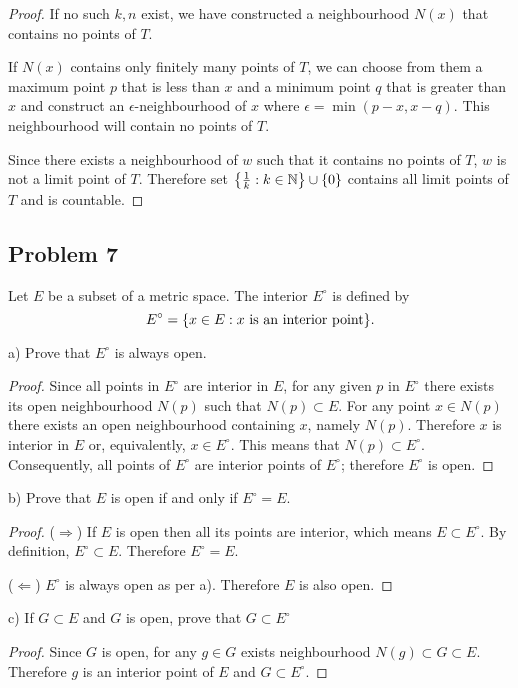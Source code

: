 \documentclass{article}
\newcommand{\N}{\mathbb{N}}
\DeclarePairedDelimiter{\set}{ \{ }{ \} }
\begin{document}
\begin{proof}
If no such $k, n$ exist, we have constructed a neighbourhood $N(x)$ that contains no points of $T$. 

If $N(x)$ contains only finitely many points of $T$, we can choose from them a maximum point $p$ that is less than $x$ and a minimum point $q$ that is greater than $x$ and construct an $\epsilon$-neighbourhood of $x$ where $\epsilon = \min(p-x, x-q)$.
This neighbourhood will contain no points of $T$.

Since there exists a neighbourhood of $w$ such that it contains no points of $T$, $w$ is not a limit point of $T$.
Therefore set $\set*{ \frac{1}{k} : k \in \N } \cup \set{0}$ contains all limit points of $T$ and is countable.

\end{proof}


\subsection*{Problem 7}

\begin{tcolorbox}
Let $E$ be a subset of a metric space.
The interior $E^\circ$ is defined by
\[ E^\circ = \set{x \in E : x \text{ is an interior point} }. \]

a) Prove that $E^\circ$ is always open.
\end{tcolorbox}

\begin{proof}

Since all points in $E^\circ$ are interior in $E$, for any given $p$ in $E^\circ$ there exists its open neighbourhood $N(p)$ such that $N(p) \subset E$.
For any point $x \in N(p)$ there exists an open neighbourhood containing $x$, namely $N(p)$.
Therefore $x$ is interior in $E$ or, equivalently, $x \in E^\circ$. This means that $N(p) \subset E^\circ$.
Consequently, all points of $E^\circ$ are interior points of $E^\circ$; therefore $E^\circ$ is open.

\end{proof}

\begin{tcolorbox}
b) Prove that $E$ is open if and only if $E^\circ = E$.
\end{tcolorbox}

\begin{proof}

($\Rightarrow$) If $E$ is open then all its points are interior, which means $E \subset E^\circ$.
By definition, $E^\circ \subset E$. Therefore $E^\circ = E$.

($\Leftarrow$) $E^\circ$ is always open as per a).
Therefore $E$ is also open.

\end{proof}

\begin{tcolorbox}
c) If $G \subset E$ and $G$ is open, prove that $G \subset E^\circ$
\end{tcolorbox}

\begin{proof}

Since $G$ is open, for any $g \in G$ exists neighbourhood $N(g) \subset G \subset E$.
Therefore $g$ is an interior point of $E$ and $G \subset E^\circ$.

\end{proof}
\end{document}
